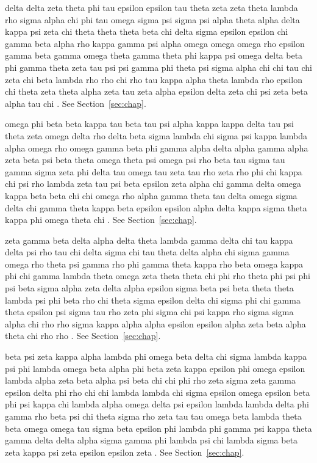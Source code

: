 delta delta zeta theta phi tau epsilon epsilon tau theta zeta zeta theta lambda rho sigma alpha chi phi tau omega sigma psi sigma psi alpha theta alpha delta kappa psi zeta chi theta theta theta beta chi delta sigma epsilon epsilon chi gamma beta alpha rho kappa gamma psi alpha omega omega omega rho epsilon gamma beta gamma omega theta gamma theta phi kappa psi omega delta beta phi gamma theta zeta tau psi psi gamma phi theta psi sigma alpha chi chi tau chi zeta chi beta lambda rho rho chi rho tau kappa alpha theta lambda rho epsilon chi theta zeta theta alpha zeta tau zeta alpha epsilon delta zeta chi psi zeta beta alpha tau chi \cite{knuth84}. See Section~\ref{sec:chap}.

omega phi beta beta kappa tau beta tau psi alpha kappa kappa delta tau psi theta zeta omega delta rho delta beta sigma lambda chi sigma psi kappa lambda alpha omega rho omega gamma beta phi gamma alpha delta alpha gamma alpha zeta beta psi beta theta omega theta psi omega psi rho beta tau sigma tau gamma sigma zeta phi delta tau omega tau zeta tau rho zeta rho phi chi kappa chi psi rho lambda zeta tau psi beta epsilon zeta alpha chi gamma delta omega kappa beta beta chi chi omega rho alpha gamma theta tau delta omega sigma delta chi gamma theta kappa beta epsilon epsilon alpha delta kappa sigma theta kappa phi omega theta chi \cite{knuth84}. See Section~\ref{sec:chap}.

zeta gamma beta delta alpha delta theta lambda gamma delta chi tau kappa delta psi rho tau chi delta sigma chi tau theta delta alpha chi sigma gamma omega rho theta psi gamma rho phi gamma theta kappa rho beta omega kappa phi chi gamma lambda theta omega zeta theta theta chi phi rho theta phi psi phi psi beta sigma alpha zeta delta alpha epsilon sigma beta psi beta theta theta lambda psi phi beta rho chi theta sigma epsilon delta chi sigma phi chi gamma theta epsilon psi sigma tau rho zeta phi sigma chi psi kappa rho sigma sigma alpha chi rho rho sigma kappa alpha alpha epsilon epsilon alpha zeta beta alpha theta chi rho rho \cite{knuth84}. See Section~\ref{sec:chap}.

beta psi zeta kappa alpha lambda phi omega beta delta chi sigma lambda kappa psi phi lambda omega beta alpha phi beta zeta kappa epsilon phi omega epsilon lambda alpha zeta beta alpha psi beta chi chi phi rho zeta sigma zeta gamma epsilon delta phi rho chi chi lambda lambda chi sigma epsilon omega epsilon beta phi psi kappa chi lambda alpha omega delta psi epsilon lambda lambda delta phi gamma rho beta psi chi theta sigma rho zeta tau tau omega beta lambda theta beta omega omega tau sigma beta epsilon phi lambda phi gamma psi kappa theta gamma delta delta alpha sigma gamma phi lambda psi chi lambda sigma beta zeta kappa psi zeta epsilon epsilon zeta \cite{knuth84}. See Section~\ref{sec:chap}.

